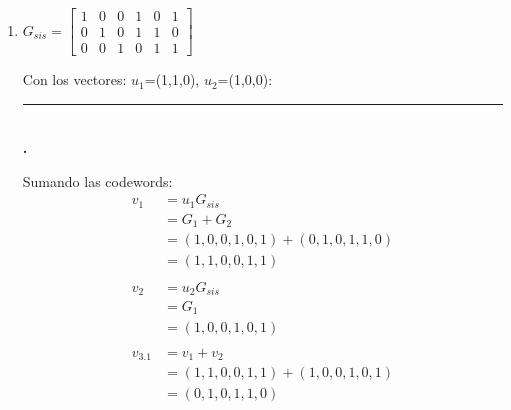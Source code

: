 \documentclass[11pt,fleqn]{article}
\begin{document}
\begin{enumerate}[label=\alph*)]
Buscamos la codeword como:

$v=uG_{sis}$

Usando el metodo por sumatoria de filas:

u=(1,0,1)

Columnas distintas de cero (1,3), entonces:
\begin{align*}
v
&=G_1+G_3\\
&=(1,0,0,1,0,1)+(0,0,1,0,1,1)\\
&=(1,0,1,1,1,0)
\end{align*}

Finalmente verificamos que $vH^T=0$, usando:

$H^T=
\begin{bmatrix}
1&0&1\\
1&1&0\\
0&1&1\\
1&0&0\\
0&1&0\\
0&0&1
\end{bmatrix}
$

Usando el metodo por sumatoria de filas:

v=(1,0,1,1,1,0)

Columnas distintas de cero (1,3,4,5), entonces:
\begin{align*}
vH^T
&=H^T_1+H^T_3+H^T_4+H^T_5\\
&=(1,0,1)+(0,1,1)+(1,0,0)+(0,1,0)\\
&=(1+0+1+0,0+1+0+1,1+1+0+0)\\
&=(0,0,0)
\end{align*}

\item {}

$G_{sis}=
\begin{bmatrix}
1&0&0&1&0&1\\
0&1&0&1&1&0\\
0&0&1&0&1&1
\end{bmatrix}
$

Con los vectores: $u_1$=(1,1,0), $u_2$=(1,0,0):

\rule{4cm}{0.4pt}\\\textbf{\textbar {}.}

Sumando las codewords:
\begin{align*}
    v_1
    &=u_1G_{sis}\\
    &=G_1+G_2\\
    &=(1,0,0,1,0,1)+(0,1,0,1,1,0)\\
    &=(1,1,0,0,1,1)\\ \\
    v_2
    &=u_2G_{sis}\\
    &=G_1\\
    &=(1,0,0,1,0,1)\\ \\
    v_{3.1}
    &=v_1+v_2\\
    &=(1,1,0,0,1,1)+(1,0,0,1,0,1)\\
    &=(0,1,0,1,1,0)
\end{align*}


\end{enumerate}
\end{document}
